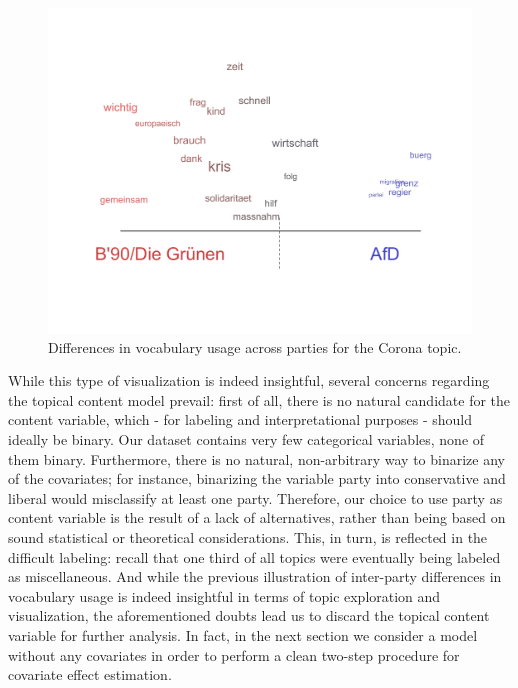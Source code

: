 \begin{figure}[h!]
  \centering
  \captionsetup{justification=centering,margin=2cm}
  \includegraphics[scale = 0.5]{../plots/4_5/t8_vocab_parties.pdf}
  \caption{Differences in vocabulary usage across parties for the Corona topic.}
  \label{fig:t8_vocab_parties}
\end{figure}

While this type of visualization is indeed insightful, several concerns regarding the topical content model prevail: first of all, there is no natural candidate for the content variable, which - for labeling and interpretational purposes - should ideally be binary. Our dataset contains very few categorical variables, none of them binary. Furthermore, there is no natural, non-arbitrary way to binarize any of the covariates; for instance, binarizing the variable party into conservative and liberal would misclassify at least one party. Therefore, our choice to use party as content variable is the result of a lack of alternatives, rather than being based on sound statistical or theoretical considerations. This, in turn, is reflected in the difficult labeling: recall that one third of all topics were eventually being labeled as miscellaneous. And while the previous illustration of inter-party differences in vocabulary usage is indeed insightful in terms of topic exploration and visualization, the aforementioned doubts lead us to discard the topical content variable for further analysis. In fact, in the next section we consider a model without any covariates in order to perform a clean two-step procedure for covariate effect estimation.

